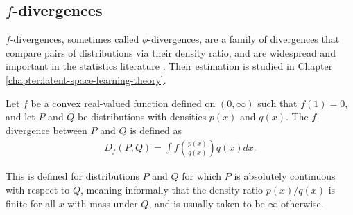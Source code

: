 
\subsection{$f$-divergences}\label{subsec:f-divergences-intro}



$f$-divergences, sometimes called $\phi$-divergences, are a family of divergences that compare pairs of distributions via their density ratio, and are widespread and important in the statistics literature \citep{csiszar2004information, liese2006divergences, tsybakov2009}. Their estimation is studied in Chapter \ref{chapter:latent-space-learning-theory}.

\medskip

\begin{definition}
Let $f$ be a convex real-valued function defined on $(0, \infty)$ such that $f(1)=0$, and let $P$ and $Q$ be distributions with densities $p(x)$ and $q(x)$.
The $f$-divergence between $P$ and $Q$ is defined as
%
\begin{align*}
D_f(P, Q) = \int f\left(\frac{p(x)}{q(x)}\right) q(x) dx.
\end{align*}
%
\end{definition}
This is defined for distributions $P$ and $Q$ for which $P$ is absolutely continuous with respect to $Q$, meaning informally that the density ratio $p(x)/q(x)$ is finite for all $x$ with mass under $Q$, and is usually taken to be $\infty$ otherwise.

